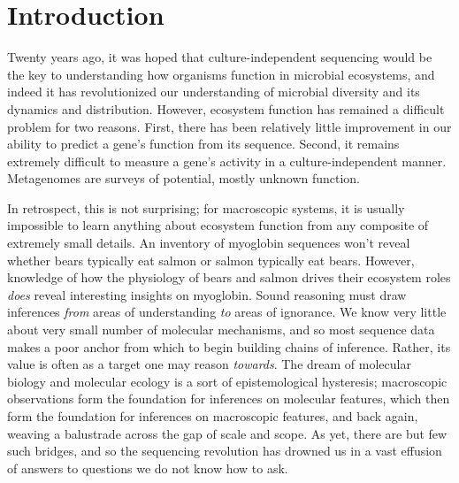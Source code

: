 \section*{Introduction}

Twenty years ago, it was hoped that culture-independent sequencing would be the key to understanding how organisms function in microbial ecosystems, and indeed it has revolutionized our understanding of microbial diversity and its dynamics and distribution. However, ecosystem function has remained a difficult problem for two reasons. First, there has been relatively little improvement in our ability to predict a gene's function from its sequence. Second, it remains extremely difficult to measure a gene's activity in a culture-independent manner. Metagenomes are surveys of potential, mostly unknown function.

In retrospect, this is not surprising; for macroscopic systems, it is usually impossible to learn anything about ecosystem function from any composite of extremely small details. An inventory of myoglobin sequences won't reveal whether bears typically eat salmon or salmon typically eat bears. However, knowledge of how the physiology of bears and salmon drives their ecosystem roles {\em does} reveal interesting insights on myoglobin. Sound reasoning must draw inferences {\em from} areas of understanding {\em to} areas of ignorance. We know very little about very small number of molecular mechanisms, and so most sequence data makes a poor anchor from which to begin building chains of inference. Rather, its value is often as a target one may reason {\em towards}. The dream of molecular biology and molecular ecology is a sort of epistemological hysteresis; macroscopic observations form the foundation for inferences on molecular features, which then form the foundation for inferences on macroscopic features, and back again, weaving a balustrade across the gap of scale and scope. As yet, there are but few such bridges, and so the sequencing revolution has drowned us in a vast effusion of answers to questions we do not know how to ask.